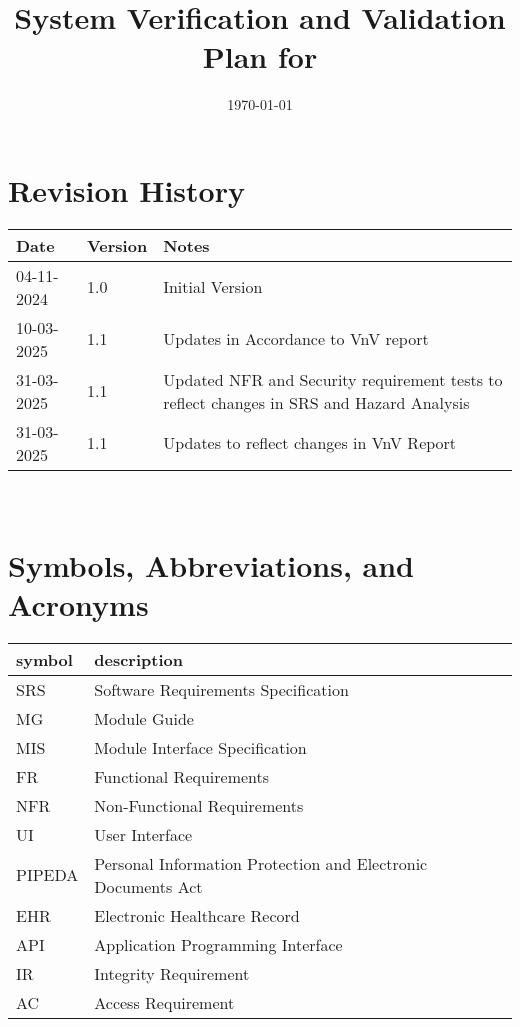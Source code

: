 \documentclass[12pt, titlepage]{article}
\begin{document}
\title{System Verification and Validation Plan for \progname{}} 
\author{\authname}
\date{\today}
	
\maketitle


\section*{Revision History}

\begin{tabularx}{\textwidth}{p{3cm}p{2cm}X}
\toprule {\bf Date} & {\bf Version} & {\bf Notes}\\
\midrule
04-11-2024 & 1.0 & Initial Version\\
10-03-2025 & 1.1 & Updates in Accordance to VnV report\\
31-03-2025 & 1.1 & Updated NFR and Security requirement tests to reflect changes in SRS and Hazard Analysis\\
31-03-2025 & 1.1 & Updates to reflect changes in VnV Report\\
\bottomrule
\end{tabularx}

~\\

\newpage

\tableofcontents

\listoftables


\newpage

\section{Symbols, Abbreviations, and Acronyms} \label{section:1}

\renewcommand{\arraystretch}{1.2}
\begin{tabular}{l l} 
  \toprule		
  \textbf{symbol} & \textbf{description}\\
  \midrule 
  SRS & Software Requirements Specification\\
  MG & Module Guide\\
  MIS & Module Interface Specification\\
  FR & Functional Requirements\\
  NFR & Non-Functional Requirements\\
  UI & User Interface\\
  PIPEDA & Personal Information Protection and Electronic Documents Act\\
  EHR & Electronic Healthcare Record\\
  API & Application Programming Interface \\
  IR & Integrity Requirement \\
  AC & Access Requirement \\
  \bottomrule
\end{tabular}\\
\end{document}
